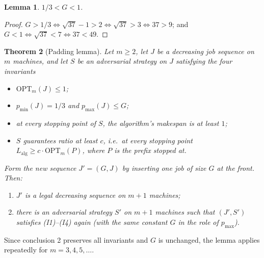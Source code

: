 \documentclass[11pt]{article}
\newtheorem{theorem}{Theorem}
\newtheorem{lemma}[theorem]{Lemma}
\theoremstyle{definition}
\newcommand{\opt}{\mathrm{OPT}}
\newcommand{\alg}{\mathrm{alg}}
\begin{document}
\begin{lemma}
\label{lem:range}
$1/3<G<1$.
\end{lemma}
\begin{proof}
$G>1/3\iff\sqrt{37}-1>2\iff\sqrt{37}>3\iff 37>9$; and
$G<1\iff\sqrt{37}<7\iff 37<49$.
\end{proof}

\begin{theorem}[Padding lemma]
\label{thm:padding}
Let $m\ge 2$, let $J$ be a decreasing job sequence on $m$ machines, and let
$S$ be an adversarial strategy on $J$ satisfying the four invariants
\begin{itemize}
\item[\textbf{(I1)}] $\opt_{m}(J)\le 1$;
\item[\textbf{(I2)}] $p_{\min}(J)=1/3$ and $p_{\max}(J)\le G$;
\item[\textbf{(I3)}] at every stopping point of $S$, the algorithm's
makespan is at least $1$;
\item[\textbf{(I4)}] $S$ guarantees ratio at least $c$, i.e.\ at every
stopping point $L_{\alg}\ge c\cdot\opt_{m}(P)$, where $P$ is the prefix
stopped at.
\end{itemize}
Form the new sequence $J'=(G,J)$ by inserting one job of size $G$ at the
front. Then:
\begin{enumerate}
\item $J'$ is a legal decreasing sequence on $m+1$ machines;
\item there is an adversarial strategy $S'$ on $m+1$ machines such that
$(J',S')$ satisfies \emph{(I1)--(I4)} again (with the same constant $G$ in
the role of $p_{\max}$).
\end{enumerate}
\end{theorem}

Since conclusion 2 preserves all invariants and $G$ is unchanged, the lemma
applies repeatedly for $m=3,4,5,\dots$.
\end{document}
